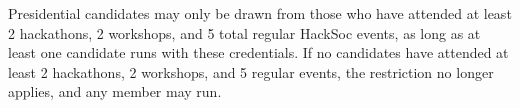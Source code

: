 \begin{clause}
  Presidential candidates may only be drawn from those who have attended at least 2 hackathons, 2 workshops, and 5 total regular HackSoc events, as long as at least one candidate runs with these credentials. If no candidates have attended at least 2 hackathons, 2 workshops, and 5 regular events, the restriction no longer applies, and any member may run.
\end{clause}